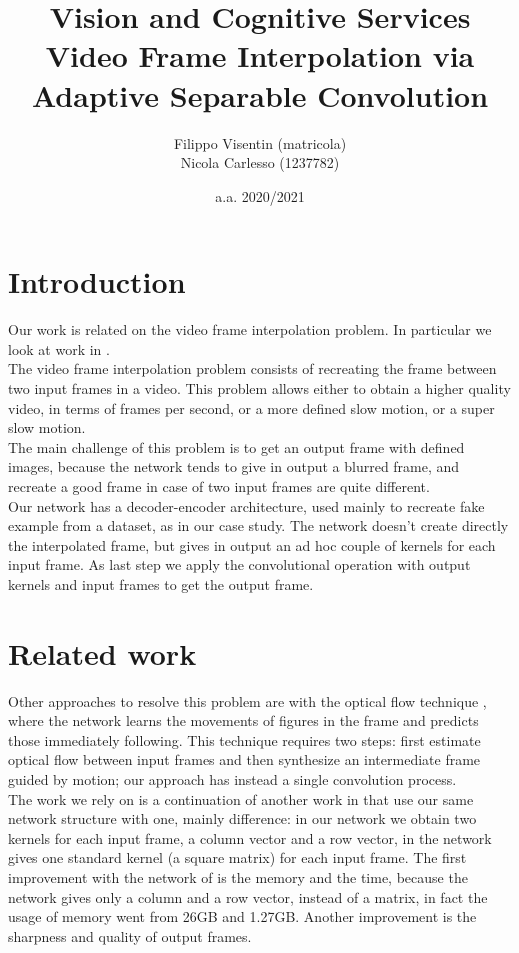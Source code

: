 \documentclass[11pt, a4paper]{article}
\title{Vision and Cognitive Services\\
\large Video Frame Interpolation via Adaptive Separable Convolution}
\author{Filippo Visentin (matricola)\\
Nicola Carlesso (1237782)}
\date{a.a. 2020/2021}
\begin{document}
	\maketitle
	\newpage
	
	\tableofcontents
	\newpage
	
	\section{Introduction}
	Our work is related on the video frame interpolation problem. In particular we look at work in \cite{mainpaper}.\\
	The video frame interpolation problem consists of recreating the frame between two input frames in a video. This problem allows either to obtain a higher quality video, in terms of frames per second, or a more defined slow motion, or a super slow motion.\\
	The main challenge of this problem is to get an output frame with defined images, because the network tends to give in output a blurred frame, and recreate a good frame in case of two input frames are quite different.\\
	Our network has a decoder-encoder architecture, used mainly to recreate fake example from a dataset, as in our case study. The network doesn't create directly the interpolated frame, but gives in output an ad hoc couple of kernels for each input frame. As last step we apply the convolutional operation with output kernels and input frames to get the output frame. 
	
	\section{Related work}
	Other approaches to resolve this problem are with the optical flow technique \cite{optical_flow}, where the network learns the movements of figures in the frame and predicts those immediately following. This technique requires two steps: first estimate optical flow between input frames and then synthesize an intermediate frame guided by motion; our approach has instead a single convolution process.\\
	The work we rely on is a continuation of another work in \cite{previous_work} that use our same network structure with one, mainly difference: in our network we obtain two kernels for each input frame, a column vector and a row vector, in \cite{optical_flow} the network gives one standard kernel (a square matrix) for each input frame. The first improvement with the network of \cite{mainpaper} is the memory and the time, because the network gives only a column and a row vector, instead of a matrix, in fact the usage of memory went from 26GB and 1.27GB. Another improvement is the sharpness and quality of output frames.
	
\end{document}
